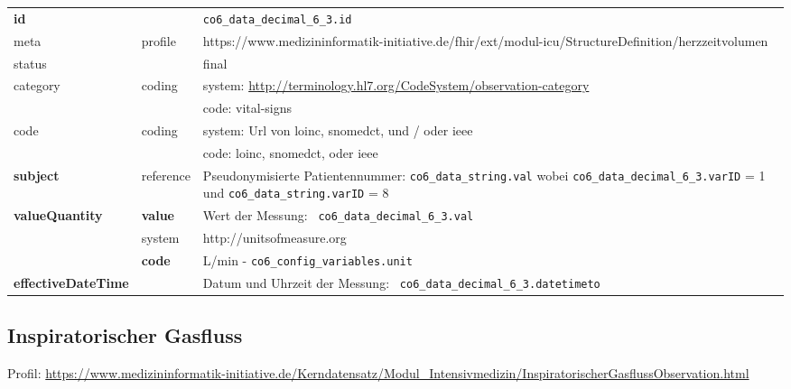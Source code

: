 \begin{longtable}{|l|l|p{7.5cm}|}
        \hline
        \rowcolor{lightgray} \multicolumn{3}{|l|}{Data Mapping (inhaltlich)} \\ \hline
        \textbf{id} &  & \texttt{co6\_data\_decimal\_6\_3.id} \\ \hline
	meta & profile & https://www.medizininformatik-initiative.de/fhir/ext/modul-icu/StructureDefinition/herzzeitvolumen \\ \hline 
	status &  & final   \\ \hline 
	category & coding & system: \url{http://terminology.hl7.org/CodeSystem/observation-category} \\
\cline{3-3}
	& & code: vital-signs \\ \hline
	code & coding & system: Url von \ac{loinc}, \ac{snomedct}, und / oder \ac{ieee} \\ 
	\cline{3-3} 
	 &  & code: \ac{loinc}, \ac{snomedct}, oder \ac{ieee} \\ \hline
	 \textbf{subject} & reference & Pseudonymisierte Patientennummer: \texttt{co6\_data\_string.val} wobei \texttt{co6\_data\_decimal\_6\_3.varID} = 1 und \texttt{co6\_data\_string.varID} = 8 \\ \hline
	 \textbf{valueQuantity}  & \textbf{value} & Wert der Messung: \texttt{
co6\_data\_decimal\_6\_3.val} \\
        \cline{2-3}
         & system & http://unitsofmeasure.org \\
         \cline{2-3}
         & \textbf{code} &
L/min - \texttt{co6\_config\_variables.unit}
\\ \hline
     \textbf{effectiveDateTime}  & & Datum und Uhrzeit der Messung: \texttt{
co6\_data\_decimal\_6\_3.datetimeto} \\
     \hline
\end{longtable}


\subsection{Inspiratorischer Gasfluss} 

Profil: \url{https://www.medizininformatik-initiative.de/Kerndatensatz/Modul_Intensivmedizin/InspiratorischerGasflussObservation.html}

